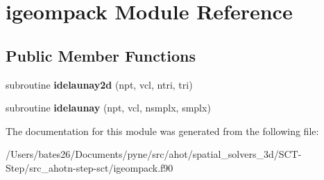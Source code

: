 \hypertarget{classigeompack}{\section{igeompack Module Reference}
\label{classigeompack}
}
\subsection*{Public Member Functions}
\begin{DoxyCompactItemize}
\item 
\hypertarget{classigeompack_af1c735d960955c236182dc083e4e9840}{subroutine {\bfseries idelaunay2d} (npt, vcl, ntri, tri)}\label{classigeompack_af1c735d960955c236182dc083e4e9840}

\item 
\hypertarget{classigeompack_a5afd38aaf62a7dc9d576f59edb07ef93}{subroutine {\bfseries idelaunay} (npt, vcl, nsmplx, smplx)}\label{classigeompack_a5afd38aaf62a7dc9d576f59edb07ef93}

\end{DoxyCompactItemize}


The documentation for this module was generated from the following file\+:\begin{DoxyCompactItemize}
\item 
/\+Users/bates26/\+Documents/pyne/src/ahot/spatial\+\_\+solvers\+\_\+3d/\+S\+C\+T-\/\+Step/src\+\_\+ahotn-\/step-\/sct/igeompack.\+f90\end{DoxyCompactItemize}

